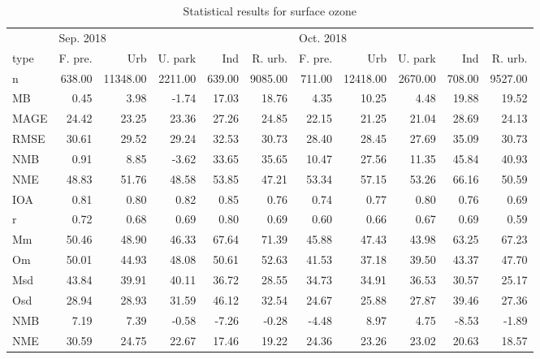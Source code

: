 \begin{table}
\centering
\caption{Statistical results for surface ozone}
\label{tab: o3_sta}
\begin{tabular}{lrrrrrrrrrr}
\toprule
{} & \multicolumn{5}{l}{Sep. 2018} & \multicolumn{5}{l}{Oct. 2018} \\
type &   F. pre. &       Urb &  U. park &     Ind &  R. urb. &   F. pre. &       Urb &  U. park &     Ind &  R. urb. \\
\midrule
n    &    638.00 &  11348.00 &  2211.00 &  639.00 &  9085.00 &    711.00 &  12418.00 &  2670.00 &  708.00 &  9527.00 \\
MB   &      0.45 &      3.98 &    -1.74 &   17.03 &    18.76 &      4.35 &     10.25 &     4.48 &   19.88 &    19.52 \\
MAGE &     24.42 &     23.25 &    23.36 &   27.26 &    24.85 &     22.15 &     21.25 &    21.04 &   28.69 &    24.13 \\
RMSE &     30.61 &     29.52 &    29.24 &   32.53 &    30.73 &     28.40 &     28.45 &    27.69 &   35.09 &    30.73 \\
NMB  &      0.91 &      8.85 &    -3.62 &   33.65 &    35.65 &     10.47 &     27.56 &    11.35 &   45.84 &    40.93 \\
NME  &     48.83 &     51.76 &    48.58 &   53.85 &    47.21 &     53.34 &     57.15 &    53.26 &   66.16 &    50.59 \\
IOA  &      0.81 &      0.80 &     0.82 &    0.85 &     0.76 &      0.74 &      0.77 &     0.80 &    0.76 &     0.69 \\
r    &      0.72 &      0.68 &     0.69 &    0.80 &     0.69 &      0.60 &      0.66 &     0.67 &    0.69 &     0.59 \\
Mm   &     50.46 &     48.90 &    46.33 &   67.64 &    71.39 &     45.88 &     47.43 &    43.98 &   63.25 &    67.23 \\
Om   &     50.01 &     44.93 &    48.08 &   50.61 &    52.63 &     41.53 &     37.18 &    39.50 &   43.37 &    47.70 \\
Msd  &     43.84 &     39.91 &    40.11 &   36.72 &    28.55 &     34.73 &     34.91 &    36.53 &   30.57 &    25.17 \\
Osd  &     28.94 &     28.93 &    31.59 &   46.12 &    32.54 &     24.67 &     25.88 &    27.87 &   39.46 &    27.36 \\
NMB  &      7.19 &      7.39 &    -0.58 &   -7.26 &    -0.28 &     -4.48 &      8.97 &     4.75 &   -8.53 &    -1.89 \\
NME  &     30.59 &     24.75 &    22.67 &   17.46 &    19.22 &     24.36 &     23.26 &    23.02 &   20.63 &    18.57 \\
\bottomrule
\end{tabular}
\end{table}

